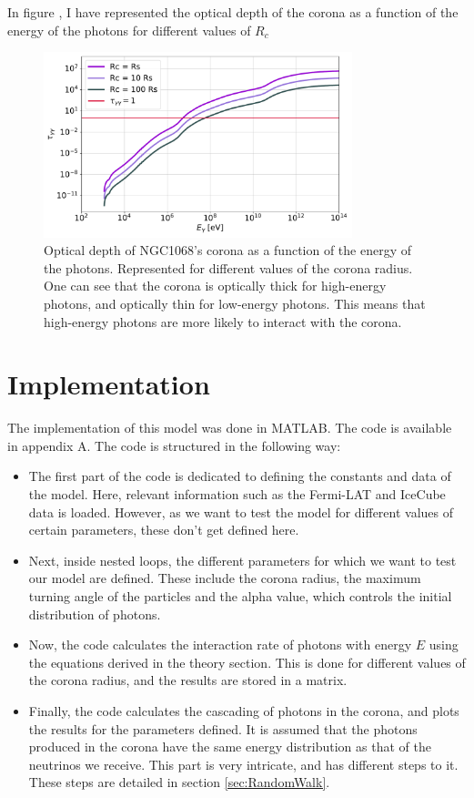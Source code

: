 In figure , I have represented the optical depth of the corona as a function of the energy of the photons for different values of $R_c$

\begin{figure}[ht]
    \includegraphics[width=0.8\textwidth]{Figures/OpticalDepths.pdf}
    \centering
    \caption{Optical depth of NGC1068's corona as a function of the energy of the photons. Represented for different values of the corona radius. One can see that the corona is optically thick for high-energy photons, and optically thin for low-energy photons. This means that high-energy photons are more likely to interact with the corona.}
    \label{fig:optical_depth_as_function_of_corona_radius}
\end{figure}


\section{Implementation}

The implementation of this model was done in MATLAB. The code is available in appendix A. The code is structured in the following way:

\begin{itemize}
    \item The first part of the code is dedicated to defining the constants and data of the model. Here, relevant information such as the Fermi-LAT and IceCube data is loaded. However, as we want to test the model for different values of certain parameters, these don't get defined here.
    \item Next, inside nested loops, the different parameters for which we want to test our model are defined. These include the corona radius, the maximum turning angle of the particles and the alpha value, which controls the initial distribution of photons.
    \item Now, the code calculates the interaction rate of photons with energy $E$ using the equations derived in the theory section. This is done for different values of the corona radius, and the results are stored in a matrix.
    \item Finally, the code calculates the cascading of photons in the corona, and plots the results for the parameters defined. It is assumed that the photons produced in the corona have the same energy distribution as that of the neutrinos we receive. 
    This part is very intricate, and has different steps to it. These steps are detailed in section \ref{sec:RandomWalk}.
\end{itemize}

